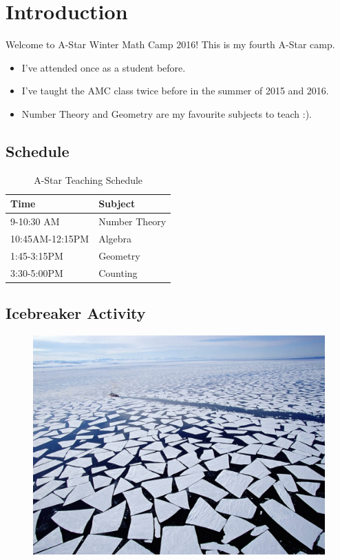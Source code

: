 \clearpage


\section{Introduction}

Welcome to A-Star Winter Math Camp 2016!  This is my fourth A-Star camp.  
\begin{itemize}
	\item  I've attended once as a student before.
	\item  I've taught the AMC class twice before in the summer of 2015 and 2016.
	\item Number Theory and Geometry are my favourite subjects to teach :).   
\end{itemize}


\clearpage


\subsection{Schedule}

\begin{table}[h]
	\centering
	\begin{tabular}{l l}
		\toprule
		\textbf{Time} & \textbf{Subject} \\
		\midrule
		9-10:30 AM & Number Theory \\
		10:45AM-12:15PM & Algebra \\ 
		1:45-3:15PM & Geometry \\
		3:30-5:00PM & Counting \\
		\bottomrule
	\end{tabular}
	\caption{A-Star Teaching Schedule}
\end{table}

\clearpage 
\subsection{Icebreaker Activity}

\begin{figure}[h]
	\centering\includegraphics[width=0.5\linewidth]{images/icebreaker.jpg}
\end{figure}

